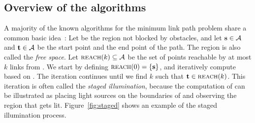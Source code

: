 \documentclass[english,gradu]{tktltiki2018}
\begin{document}
\subsection{Overview of the algorithms}\label{sec:overview}

A majority of the known algorithms for the minimum link path problem share a common basic idea~\cite[Sections 26.4, 27.3]{handbook}:
Let \fspace be the region not blocked by obstacles, and let $\textbf{s}\in\mathcal{A}$ and $\textbf{t}\in\mathcal{A}$ be the start point and the end point of the path.
The region \fspace is also called the \emph{free space}.
Let $\textsc{reach}(k)\subseteq\mathcal{A}$ be the set of points reachable by at most $k$ links from \spt.
We start by defining $\textsc{reach}(0)=\left\{\textbf{s}\right\}$, and iteratively compute  based on .
The iteration continues until we find $k$ such that $\textbf{t}\in\textsc{reach}(k)$.
This iteration is often called the \emph{staged illumination}, because the computation of  can be illustrated as placing light sources on the boundaries of  and observing the region that gets lit.
Figure~\ref{fig:staged} shows an example of the staged illumination process.
\end{document}
